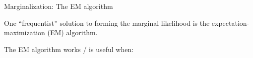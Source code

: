 
\begin{frame}{Marginalization: The EM algorithm}

One ``frequentist'' solution to forming the marginal likelihood is the
expectation-maximization (EM) algorithm.

The EM algorithm works / is useful when:
%
\begin{align*}
%
%
\end{align*}
%


\end{frame}
